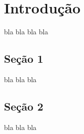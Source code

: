 \documentclass[embeddedlogo]{ufsc-thesis-rn46-2019}
\begin{document}
\chapter{Introdução}
bla bla bla bla 

\section{Seção 1}
    bla bla bla

\section{Seção 2}
    bla bla bla








\postextual

\end{document}
